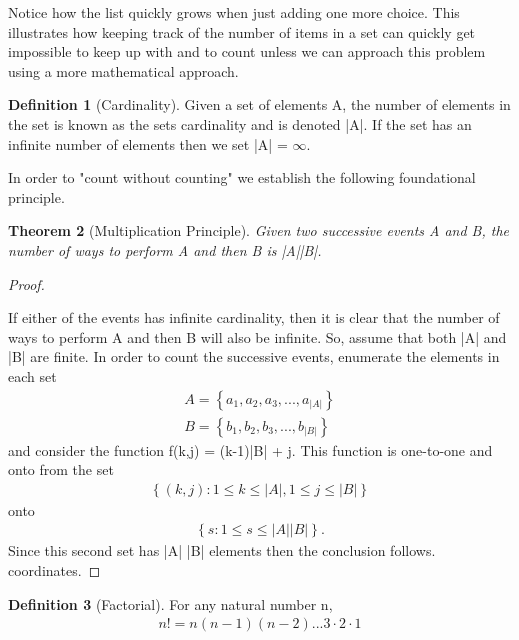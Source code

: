 \documentclass[10pt,]{book}
\theoremstyle{plain}
\newtheorem{theorem}{Theorem}[section]
\theoremstyle{definition}
\newtheorem{definition}[theorem]{Definition}
\theoremstyle{definition}
\theoremstyle{definition}
\numberwithin{equation}{section}
\begin{document}
Notice how the list quickly grows when just adding one more choice. This illustrates how keeping track of the number of items in a set can quickly get impossible to keep up with and to count unless we can approach this problem using a more mathematical approach.
%
\begin{definition}[{Cardinality}]\label{definition-17}
Given a set of elements A, the number of elements in the 
		set is known as the sets cardinality and is denoted |A|. If the set has 
		an infinite number of elements then we set |A| = \(\infty\).
		\end{definition}
\par
In order to "count without counting" we establish the following 
	foundational principle.%
\begin{theorem}[{Multiplication Principle}]\label{theorem-9}
Given two successive events A and B, the number of ways 
		to perform A and then B is |A||B|.
		\end{theorem}
\begin{proof}\hypertarget{proof-6}{}
If either of the events has infinite cardinality, then it is 
			clear
			that the number of ways to perform A and then B will also be 
			infinite. So, assume that both |A| and |B| are finite.
			In order to count the successive events, enumerate the elements in
			each set
			\begin{gather*}
A = \left \{ a_1, a_2, a_3, ... , a_{|A|} \right \}\\
B = \left \{  b_1, b_2, b_3, ... , b_{|B|} \right \}
\end{gather*}
			and consider the function f(k,j) = (k-1)|B| + j. This function is 
			one-to-one and onto from the set 
			\begin{gather*}
\left \{ (k,j): 1 \le k \le |A|, 1 \le j \le |B| \right \} 
\end{gather*} 
			onto 
			\begin{gather*}
\left \{ s : 1 \le s \le |A| |B| \right \}.
\end{gather*} 
			Since this
			second set has |A| |B| elements then the conclusion follows. 
			coordinates.%
\end{proof}
\begin{definition}[{Factorial}]\label{definition-18}
For any natural number n, 
		\begin{gather*}
n! = n(n-1)(n-2) ... 3 \cdot 2 \cdot 1
\end{gather*}
\end{definition}
\end{document}

